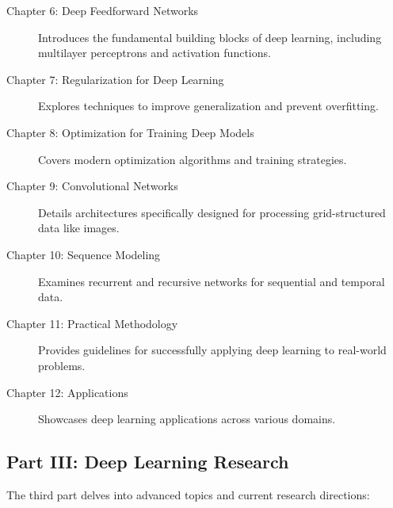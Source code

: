 \begin{description}
    \item[Chapter 6: Deep Feedforward Networks] Introduces the fundamental building blocks of deep learning, including multilayer perceptrons and activation functions.
    
    \item[Chapter 7: Regularization for Deep Learning] Explores techniques to improve generalization and prevent overfitting.
    
    \item[Chapter 8: Optimization for Training Deep Models] Covers modern optimization algorithms and training strategies.
    
    \item[Chapter 9: Convolutional Networks] Details architectures specifically designed for processing grid-structured data like images.
    
    \item[Chapter 10: Sequence Modeling] Examines recurrent and recursive networks for sequential and temporal data.
    
    \item[Chapter 11: Practical Methodology] Provides guidelines for successfully applying deep learning to real-world problems.
    
    \item[Chapter 12: Applications] Showcases deep learning applications across various domains.
\end{description}

\subsection{Part III: Deep Learning Research}

The third part delves into advanced topics and current research directions:

